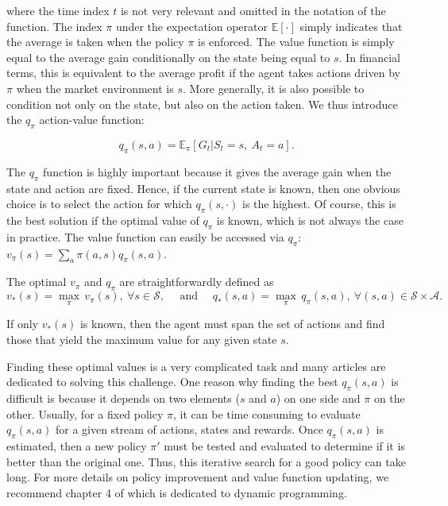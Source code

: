 where the time index $t$ is not very relevant and omitted in the notation of the function. The index $\pi$ under the expectation operator $\mathbb{E}[\cdot]$ simply indicates that the average is taken when the policy $\pi$ is enforced. The value function is simply equal to the average gain conditionally on the state being equal to $s$. In financial terms, this is equivalent to the average profit if the agent takes actions driven by $\pi$ when the market environment is $s$. More generally, it is also possible to condition not only on the state, but also on the action taken. We thus introduce the $q_\pi$ action-value function:

\begin{equation}
\label{eq-RLQ}
q_\pi(s,a)=\mathbb{E}_\pi\left[ G_t | S_t=s, \ A_t=a \right].
\end{equation}

The $q_\pi$ function is highly important because it gives the average gain when the state and action are fixed. Hence, if the current state is known, then one obvious choice is to select the action for which $q_\pi(s,\cdot)$ is the highest. Of course, this is the best solution if the optimal value of $q_\pi$ is known, which is not always the case in practice. The value function can easily be accessed via $q_\pi$: $v_\pi(s)=\sum_a \pi(a,s)q_\pi(s,a)$.

The optimal $v_\pi$ and $q_\pi$ are straightforwardly defined as
\begin{equation}
v_*(s)=\underset{\pi}{\max} \, v_\pi(s), \ \forall s\in \mathcal{S}, \quad \text{ and } \quad q_*(s,a) =\underset{\pi}{\max} \, q_\pi(s,a), \ \forall (s,a)\in \mathcal{S}\times \mathcal{A}.
\end{equation}

If only $v_*(s)$ is known, then the agent must span the set of actions and find those that yield the maximum value for any given state $s$.

Finding these optimal values is a very complicated task and many articles are dedicated to solving this challenge. One reason why finding the best $q_\pi(s,a)$ is difficult is because it depends on two elements ($s$ and $a$) on one side and $\pi$ on the other. Usually, for a fixed policy $\pi$, it can be time consuming to evaluate $q_\pi(s,a)$ for a given stream of actions, states and rewards. Once $q_\pi(s,a)$ is estimated, then a new policy $\pi'$ must be tested and evaluated to determine if it is better than the original one.
Thus, this iterative search for a good policy can take long. For more details on policy improvement and value function updating, we recommend chapter 4 of \cite{sutton2018reinforcement} which is dedicated to dynamic programming.

